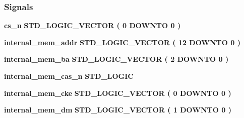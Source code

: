 \subsubsection*{Signals}
 \begin{DoxyCompactItemize}
\item 
{\bf cs\+\_\+n} {\bfseries \textcolor{comment}{S\+T\+D\+\_\+\+L\+O\+G\+I\+C\+\_\+\+V\+E\+C\+T\+OR}\textcolor{vhdlchar}{ }\textcolor{vhdlchar}{(}\textcolor{vhdlchar}{ }\textcolor{vhdlchar}{ } \textcolor{vhdldigit}{0} \textcolor{vhdlchar}{ }\textcolor{keywordflow}{D\+O\+W\+N\+TO}\textcolor{vhdlchar}{ }\textcolor{vhdlchar}{ } \textcolor{vhdldigit}{0} \textcolor{vhdlchar}{ }\textcolor{vhdlchar}{)}\textcolor{vhdlchar}{ }} 
\item 
{\bf internal\+\_\+mem\+\_\+addr} {\bfseries \textcolor{comment}{S\+T\+D\+\_\+\+L\+O\+G\+I\+C\+\_\+\+V\+E\+C\+T\+OR}\textcolor{vhdlchar}{ }\textcolor{vhdlchar}{(}\textcolor{vhdlchar}{ }\textcolor{vhdlchar}{ } \textcolor{vhdldigit}{12} \textcolor{vhdlchar}{ }\textcolor{keywordflow}{D\+O\+W\+N\+TO}\textcolor{vhdlchar}{ }\textcolor{vhdlchar}{ } \textcolor{vhdldigit}{0} \textcolor{vhdlchar}{ }\textcolor{vhdlchar}{)}\textcolor{vhdlchar}{ }} 
\item 
{\bf internal\+\_\+mem\+\_\+ba} {\bfseries \textcolor{comment}{S\+T\+D\+\_\+\+L\+O\+G\+I\+C\+\_\+\+V\+E\+C\+T\+OR}\textcolor{vhdlchar}{ }\textcolor{vhdlchar}{(}\textcolor{vhdlchar}{ }\textcolor{vhdlchar}{ } \textcolor{vhdldigit}{2} \textcolor{vhdlchar}{ }\textcolor{keywordflow}{D\+O\+W\+N\+TO}\textcolor{vhdlchar}{ }\textcolor{vhdlchar}{ } \textcolor{vhdldigit}{0} \textcolor{vhdlchar}{ }\textcolor{vhdlchar}{)}\textcolor{vhdlchar}{ }} 
\item 
{\bf internal\+\_\+mem\+\_\+cas\+\_\+n} {\bfseries \textcolor{comment}{S\+T\+D\+\_\+\+L\+O\+G\+IC}\textcolor{vhdlchar}{ }} 
\item 
{\bf internal\+\_\+mem\+\_\+cke} {\bfseries \textcolor{comment}{S\+T\+D\+\_\+\+L\+O\+G\+I\+C\+\_\+\+V\+E\+C\+T\+OR}\textcolor{vhdlchar}{ }\textcolor{vhdlchar}{(}\textcolor{vhdlchar}{ }\textcolor{vhdlchar}{ } \textcolor{vhdldigit}{0} \textcolor{vhdlchar}{ }\textcolor{keywordflow}{D\+O\+W\+N\+TO}\textcolor{vhdlchar}{ }\textcolor{vhdlchar}{ } \textcolor{vhdldigit}{0} \textcolor{vhdlchar}{ }\textcolor{vhdlchar}{)}\textcolor{vhdlchar}{ }} 
\item 
{\bf internal\+\_\+mem\+\_\+dm} {\bfseries \textcolor{comment}{S\+T\+D\+\_\+\+L\+O\+G\+I\+C\+\_\+\+V\+E\+C\+T\+OR}\textcolor{vhdlchar}{ }\textcolor{vhdlchar}{(}\textcolor{vhdlchar}{ }\textcolor{vhdlchar}{ } \textcolor{vhdldigit}{1} \textcolor{vhdlchar}{ }\textcolor{keywordflow}{D\+O\+W\+N\+TO}\textcolor{vhdlchar}{ }\textcolor{vhdlchar}{ } \textcolor{vhdldigit}{0} \textcolor{vhdlchar}{ }\textcolor{vhdlchar}{)}\textcolor{vhdlchar}{ }} 

\end{DoxyCompactItemize}
